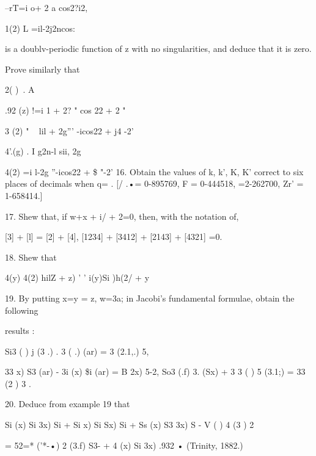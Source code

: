  --rT=i o+ 2 a cos2?i2,

 1(2) L =il-2j2ncos:

is a doublv-periodic function of z with no singularities, and deduce
that it is zero.

Prove similarly that

 2( )\ . A%

.92 (z) !=i 1 + 2? " cos 22 + 2 "

 3 (2) " ~ lil + 2g''' -icos22 + j4 -2'

 4'.(g) . I g2n-l sii, 2g

  4(2) =i l-2g ''-icos22 + \$ "-2' 16. Obtain the values of k, k', K,
K' correct to six places of decimals when q= . [/ .•= 0-895769, F =
0-444518, =2-262700, Zr' = 1-658414.]

%
%

17. Shew that, if w+x + i/ + 2=0, then, with the notation of,

[3] + [l] = [2] + [4], [1234] + [3412] + [2143] + [4321] =0.

18. Shew that

 4(y) 4(2) hilZ + z) ' ' i(y)Si )h(2/ + y

19. By putting x=y = z, w=3a; in Jacobi's fundamental formulae, obtain
the following

results :

Si3 ( ) j (3 .) . 3 ( .) (ar) = 3 (2.1,.) 5,

 33 x) S3 (ar) - 3i (x) \$i (ar) = B 2x) 5-2, So3 (.f) 3. (Sx) + 3 3 (
) 5 (3.1;) = 33 (2 ) 3 .

20. Deduce from example 19 that

 Si (x) Si 3x) Si + Si x) Si Sx) Si + Ss (x) S3 3x) S - V ( ) 4 (3 ) 2

= 52=* ('*-•) 2 (3.f) S3- + 4 (x) Si 3x) .932 • (Trinity, 1882.)

